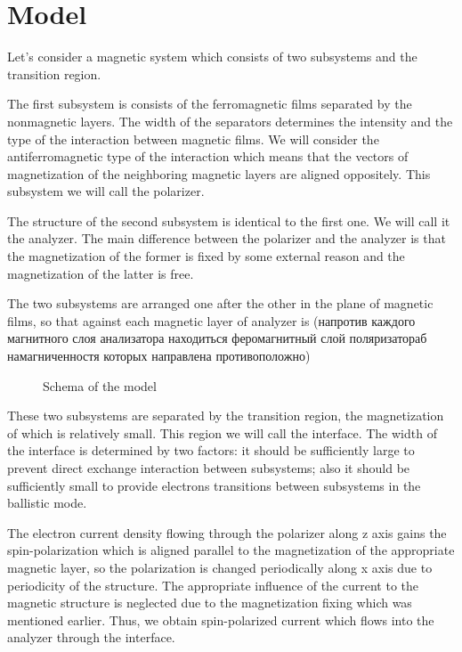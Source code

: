 \newpage

\section{Model}

Let's consider a magnetic system which consists of two subsystems and the transition region.

The first subsystem is consists of the ferromagnetic films separated by the nonmagnetic layers. The width of the separators determines the intensity and the type of the interaction between magnetic films. We will consider the antiferromagnetic type of the interaction which means that the vectors of magnetization of the neighboring magnetic layers are aligned oppositely. This subsystem we will call the polarizer.

The structure of the second subsystem is identical to the first one. We will call it the analyzer. The main difference between the polarizer and the analyzer is that the magnetization of the former is fixed by some external reason and the magnetization of the latter is free.

The two subsystems are arranged one after the other in the plane of magnetic films, so that against each magnetic layer of analyzer is  (напротив каждого магнитного слоя анализатора находиться феромагнитный слой поляризатораб намагниченностя которых направлена противоположно)

\begin{figure}[h]
	\centering
	
	\caption{Schema of the model}
	\label{fig:model}
\end{figure}

These two subsystems are separated by the transition region, the magnetization of which is relatively small. This region we will call the interface. The width of the interface is determined by two factors: it should be sufficiently large to prevent direct exchange interaction between subsystems; also it should be sufficiently small to provide electrons transitions between subsystems in the ballistic mode.

The electron current density flowing through the polarizer along z axis gains the spin-polarization which is aligned parallel to the magnetization of the appropriate magnetic layer, so the polarization is changed periodically along x axis due to periodicity of the structure. The appropriate influence of the current to the magnetic structure is neglected due to the magnetization fixing which was mentioned earlier. Thus, we obtain spin-polarized current which flows into the analyzer through the interface.

